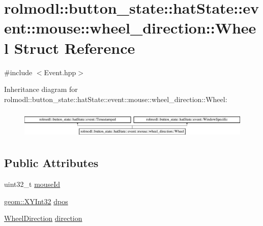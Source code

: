 \hypertarget{structrolmodl_1_1button__state_1_1hat_state_1_1event_1_1mouse_1_1wheel__direction_1_1_wheel}{}\section{rolmodl\+::button\+\_\+state\+::hat\+State\+::event\+::mouse\+::wheel\+\_\+direction\+::Wheel Struct Reference}
\label{structrolmodl_1_1button__state_1_1hat_state_1_1event_1_1mouse_1_1wheel__direction_1_1_wheel}


{\ttfamily \#include $<$Event.\+hpp$>$}

Inheritance diagram for rolmodl\+::button\+\_\+state\+::hat\+State\+::event\+::mouse\+::wheel\+\_\+direction\+::Wheel\+:\begin{figure}[H]
\begin{center}
\leavevmode
\includegraphics[height=1.400000cm]{structrolmodl_1_1button__state_1_1hat_state_1_1event_1_1mouse_1_1wheel__direction_1_1_wheel}
\end{center}
\end{figure}
\subsection*{Public Attributes}
\begin{DoxyCompactItemize}
\item 
uint32\+\_\+t \mbox{\hyperlink{structrolmodl_1_1button__state_1_1hat_state_1_1event_1_1mouse_1_1wheel__direction_1_1_wheel_a90537ea1017c03985861ac60bb2e7a8c}{mouse\+Id}}
\item 
\mbox{\hyperlink{structrolmodl_1_1geom_1_1_x_y_int32}{geom\+::\+X\+Y\+Int32}} \mbox{\hyperlink{structrolmodl_1_1button__state_1_1hat_state_1_1event_1_1mouse_1_1wheel__direction_1_1_wheel_a0f6853160cff5f2ca23fe74bc2e8b44a}{dpos}}
\item 
\mbox{\hyperlink{namespacerolmodl_1_1button__state_1_1hat_state_1_1event_1_1mouse_a203bba850745831e5abea03c154853dd}{Wheel\+Direction}} \mbox{\hyperlink{structrolmodl_1_1button__state_1_1hat_state_1_1event_1_1mouse_1_1wheel__direction_1_1_wheel_aa4eb174b13bfe4fc7c37601ec4977d11}{direction}}
\end{DoxyCompactItemize}


